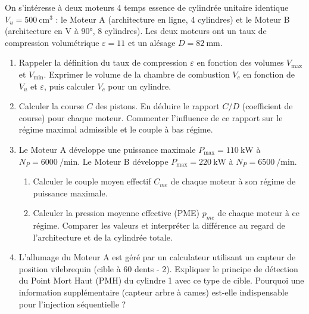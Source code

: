 \documentclass[11pt]{article}
\begin{document}
\begin{exercice}
On s'intéresse à deux moteurs 4 temps essence de cylindrée unitaire identique $V_u = \SI{500}{\centi\meter\cubed}$ : le Moteur A (architecture en ligne, 4 cylindres) et le Moteur B (architecture en V à 90°, 8 cylindres). Les deux moteurs ont un taux de compression volumétrique $\varepsilon = 11$ et un alésage $D = \SI{82}{\milli\meter}$.
\begin{enumerate}
    \item Rappeler la définition du taux de compression $\varepsilon$ en fonction des volumes $V_{\text{max}}$ et $V_{\text{min}}$. Exprimer le volume de la chambre de combustion $V_c$ en fonction de $V_u$ et $\varepsilon$, puis calculer $V_c$ pour un cylindre.
    \item Calculer la course $C$ des pistons. En déduire le rapport $C/D$ (coefficient de course) pour chaque moteur. Commenter l'influence de ce rapport sur le régime maximal admissible et le couple à bas régime.
    \item Le Moteur A développe une puissance maximale $P_{\text{max}} = \SI{110}{\kilo\watt}$ à $N_P = \SI{6000}{\per\minute}$. Le Moteur B développe $P_{\text{max}} = \SI{220}{\kilo\watt}$ à $N_P = \SI{6500}{\per\minute}$.
    \begin{enumerate}
        \item Calculer le couple moyen effectif $C_{me}$ de chaque moteur à son régime de puissance maximale.
        \item Calculer la pression moyenne effective (PME) $p_{me}$ de chaque moteur à ce régime. Comparer les valeurs et interpréter la différence au regard de l'architecture et de la cylindrée totale.
    \end{enumerate}
    \item L'allumage du Moteur A est géré par un calculateur utilisant un capteur de position vilebrequin (cible à 60 dents - 2). Expliquer le principe de détection du Point Mort Haut (PMH) du cylindre 1 avec ce type de cible. Pourquoi une information supplémentaire (capteur arbre à cames) est-elle indispensable pour l'injection séquentielle ?
\end{enumerate}
\end{exercice}
\end{document}
